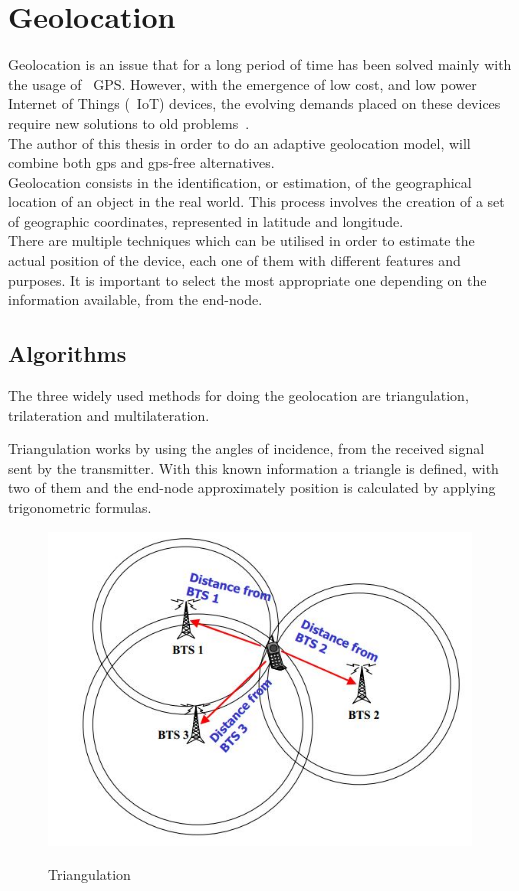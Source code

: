 \section{Geolocation} %
\label{sec:Geolocation}

Geolocation is an issue that for a long period of time has been solved mainly with the usage of ~\gls{GPS}. However, with the emergence of low cost, and low power Internet of Things (~\gls{IoT}) devices, the evolving demands placed on these devices require new solutions to old problems~\cite{Danebjer2018}.\\The author of this thesis in order to do an adaptive geolocation model, will combine both gps and gps-free alternatives.\\Geolocation consists in the identification, or estimation, of the geographical location of an object in the real world. This process involves the creation of a set of geographic coordinates, represented in latitude and longitude.\\
There are multiple techniques which can be utilised in order to estimate the actual position of the device, each one of them with  different features and purposes. It is important to select the most appropriate one depending on the information available, from the end-node.

\subsection{Algorithms}
\label{sec:Geolocation_Algorithm}

The three widely used methods  for doing the geolocation are triangulation, trilateration and multilateration. 

Triangulation works by using the  angles of incidence, from the received signal sent by  the transmitter. With this known information a triangle is defined, with two of them and the end-node approximately position is calculated by applying trigonometric formulas.\\
\begin{figure}[htbp]
  \centering
  
    {\includegraphics[width=0.5\linewidth]{Chapters/Figures/triangulation.JPG}}%
 
  \caption{Triangulation~\cite{triangulation}}
  \label{fig:Triangulation}
\end{figure}

